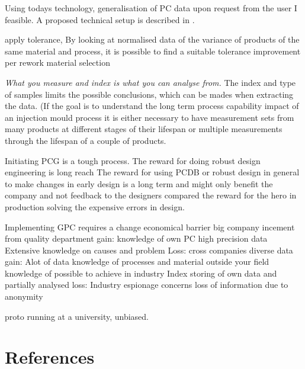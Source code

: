 \documentclass[aip,amsmath, reprint, author-year]{revtex4-1}
\begin{document}
Using todays technology, generalisation of PC data upon request from the user I feasible. A proposed technical setup is described in \cite{OkholmRask******* Techpaper}.



apply tolerance, By looking at normalised data of the variance of products of the same material and process, it is possible to find a suitable tolerance
improvement per rework
material selection

\emph{What you measure and index is what you can analyse from.}
The index and type of samples limits the possible conclusions, which can be mades when extracting the data.  (If the goal is to understand the long term process capability impact of an injection mould process it is either necessary to have measurement sets from many products at different stages of their lifespan or multiple measurements through the lifespan of a couple of products.   

Initiating PCG is a tough process. 
The reward for doing robust design engineering is long reach
The reward for using PCDB or robust design in general to make changes in early design is a long term and might only benefit the company and not feedback to the designers compared the reward for the hero in production solving the expensive errors in design.

Implementing GPC requires a change
	economical barrier
		big company
			incement from quality department
			gain: 	knowledge of own PC
					high precision data
					Extensive knowledge on causes and problem
			Loss:
		cross companies
			diverse data
			gain:		Alot of data
					knowledge of processes and material outside your field
					knowledge of possible to achieve in industry
					Index storing of own data and partially analysed
			loss:		Industry espionage concerns
					loss of information due to anonymity

proto running at a university, unbiased.




\section*{References}

\end{document}
